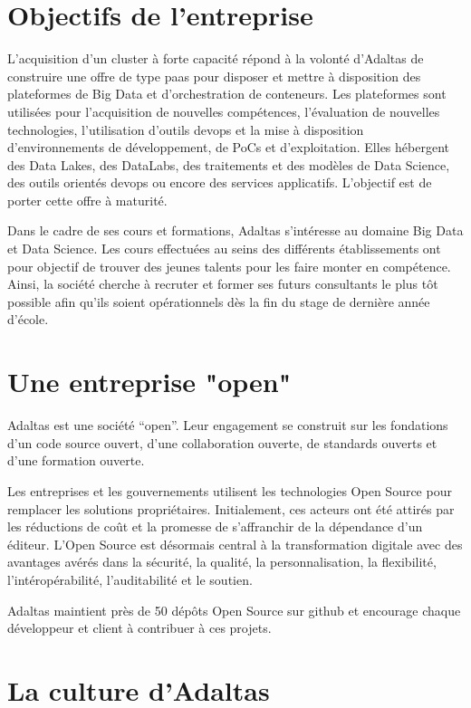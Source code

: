 \documentclass[12pt, french]{report}
\begin{document}
\section{Objectifs de l'entreprise}

L’acquisition d’un cluster à forte capacité répond à la volonté d’Adaltas de construire une offre de type \gls{paas} pour disposer et mettre à disposition des plateformes de Big Data et d’orchestration de conteneurs. Les plateformes sont utilisées pour l’acquisition de nouvelles compétences, l’évaluation de nouvelles technologies, l’utilisation d’outils \gls{devops} et la mise à disposition d’environnements de développement, de PoCs et d’exploitation. Elles hébergent des Data Lakes, des DataLabs, des traitements et des modèles de Data Science, des outils orientés \gls{devops} ou encore des services applicatifs. L’objectif est de porter cette offre à maturité.

Dans le cadre de ses cours et formations, Adaltas s'intéresse au domaine Big Data et Data Science. Les cours effectuées au seins des différents établissements ont pour objectif de trouver des jeunes talents pour les faire monter en compétence. Ainsi, la société cherche à recruter et former ses futurs consultants le plus tôt possible afin qu'ils soient opérationnels dès la fin du stage de dernière année d'école.

\section{Une entreprise "open"}

Adaltas est une société “open”. Leur engagement se construit sur les fondations d’un code source ouvert, d’une collaboration ouverte, de standards ouverts et d’une formation ouverte.

Les entreprises et les gouvernements utilisent les technologies Open Source pour remplacer les solutions propriétaires. Initialement, ces acteurs ont été attirés par les réductions de coût et la promesse de s’affranchir de la dépendance d’un éditeur. L’Open Source est désormais central à la transformation digitale avec des avantages avérés dans la sécurité, la qualité, la personnalisation, la flexibilité, l’intéropérabilité, l’auditabilité et le soutien.

Adaltas maintient près de 50 dépôts Open Source sur \gls{github} et encourage chaque développeur et client à contribuer à ces projets.

\section{La culture d'Adaltas}
\end{document}
